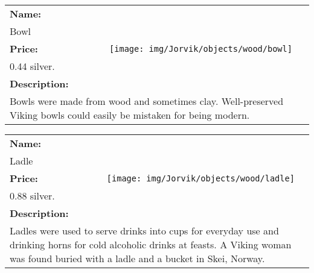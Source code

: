 \begin{table}[ht!]
	\centering
	\begin{tabular}{ p{3cm} c }\toprule
		\textbf{Name:} & \multirow{5}{*}{\texttt{[image: img/Jorvik/objects/wood/bowl]}}\\
		Bowl & \\ 
		\textbf{Price:} & \\
		0.44 silver. & \\ 
		\textbf{Description:} & \\
		\multicolumn{2}{p{12cm}}{Bowls were made from wood and sometimes clay. Well-preserved Viking bowls could easily be mistaken for being modern.}\\
		\bottomrule
	\end{tabular}
\end{table}

\begin{table}[ht!]
	\centering
	\begin{tabular}{ p{3cm} c }\toprule
		\textbf{Name:} & \multirow{5}{*}{\texttt{[image: img/Jorvik/objects/wood/ladle]}}\\
		Ladle & \\ 
		\textbf{Price:} & \\
		0.88 silver. & \\ 
		\textbf{Description:} & \\
		\multicolumn{2}{p{12cm}}{Ladles were used to serve drinks into cups for everyday use and drinking horns for cold alcoholic drinks at feasts. A Viking woman was found buried with a ladle and a bucket in Skei, Norway.}\\
		\bottomrule
	\end{tabular}
\end{table}